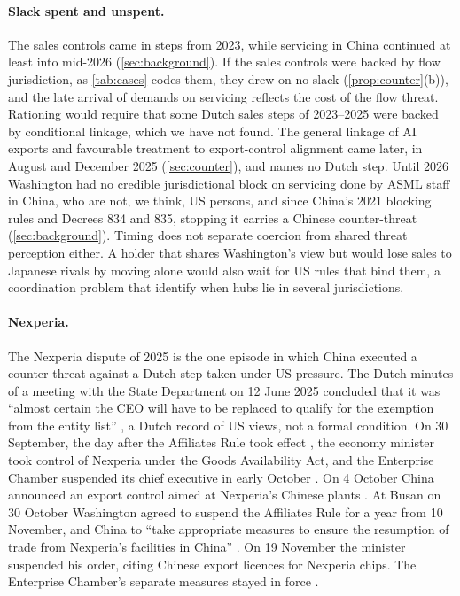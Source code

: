 \paragraph{Slack spent and unspent.} The sales controls came in steps from 2023, while servicing in China continued at least into mid-2026 (\cref{sec:background}). If the sales controls were backed by flow jurisdiction, as \cref{tab:cases} codes them, they drew on no slack (\cref{prop:counter}(b)), and the late arrival of demands on servicing reflects the cost of the flow threat. Rationing would require that some Dutch sales steps of 2023--2025 were backed by conditional linkage, which we have not found. The general linkage of AI exports and favourable treatment to export-control alignment came later, in August and December 2025 (\cref{sec:counter}), and names no Dutch step. Until 2026 Washington had no credible jurisdictional block on servicing done by ASML staff in China, who are not, we think, US persons, and since China's 2021 blocking rules and Decrees 834 and 835, stopping it carries a Chinese counter-threat (\cref{sec:background}). Timing does not separate coercion from shared threat perception either. A holder that shares Washington's view but would lose sales to Japanese rivals by moving alone would also wait for US rules that bind them, a coordination problem that \citet{farrell2019weaponized} identify when hubs lie in several jurisdictions.

\paragraph{Nexperia.} The Nexperia dispute of 2025 is the one episode in which China executed a counter-threat against a Dutch step taken under US pressure. The Dutch minutes of a meeting with the State Department on 12 June 2025 concluded that it was ``almost certain the CEO will have to be replaced to qualify for the exemption from the entity list'' \citep[paras.~2.19--2.20; our translation]{gerechtshof2025nexperia}, a Dutch record of US views, not a formal condition. On 30 September, the day after the Affiliates Rule took effect \citep{bis2025affiliatesrule}, the economy minister took control of Nexperia under the Goods Availability Act, and the Enterprise Chamber suspended its chief executive in early October \citep{kst32637720, gerechtshof2025nexperia}. On 4 October China announced an export control aimed at Nexperia's Chinese plants \citep{kst32637720}. At Busan on 30 October Washington agreed to suspend the Affiliates Rule for a year from 10 November, and China to ``take appropriate measures to ensure the resumption of trade from Nexperia's facilities in China'' \citep{fmprc2025busan, whitehouse2025busan, bis2025affiliates}. On 19 November the minister suspended his order, citing Chinese export licences for Nexperia chips. The Enterprise Chamber's separate measures stayed in force \citep{kst32637_717}.


